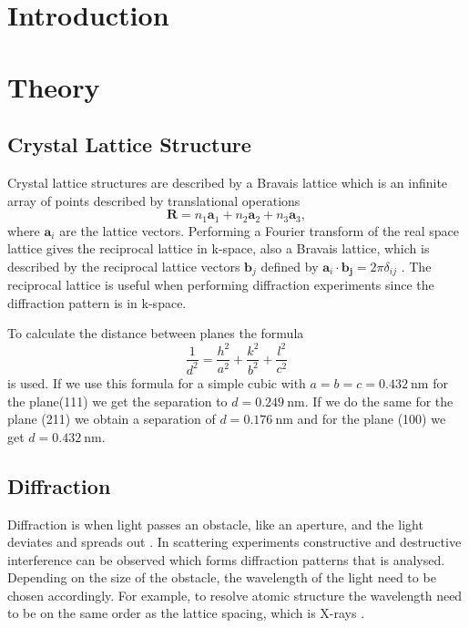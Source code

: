 \section{Introduction}


\section{Theory}
\subsection{Crystal Lattice Structure}
Crystal lattice structures are described by a Bravais lattice \cite{hofmann2015} which is an infinite array of points described by translational operations
\begin{equation}
    \mathbf{R} = n_1\mathbf{a}_1 + n_2\mathbf{a}_2 + n_3\mathbf{a}_3,
\end{equation}
where $\mathbf{a}_i$ are the lattice vectors. Performing a Fourier transform of the real space lattice gives the reciprocal lattice in k-space, also a Bravais lattice, which is described by the reciprocal lattice vectors $\mathbf{b}_j$ defined by $\mathbf{a}_i \cdot \mathbf{b_j} = 2\pi \delta_{ij}$ \cite{hofmann2015}. The reciprocal lattice is useful when performing diffraction experiments since the diffraction pattern is in k-space. 

To calculate the distance between planes the formula 
\begin{equation}
\frac{1}{d^2}=\frac{h^2}{a^2}+\frac{k^2}{b^2}+\frac{l^2}{c^2}
\label{eq:seperation}
\end{equation}
is used.
If we use this formula for a simple cubic with $a=b=c=\SI{0.432}{\nano\m}$ for the plane(111) we get the separation to $d=\SI{0.249}{\nano\m}$. If we do the same for the plane (211) we obtain a separation of $d=\SI{0.176}{\nano\m}$ and for the plane (100) we get $d=\SI{0.432}{\nano\m}$. 



\subsection{Diffraction}
Diffraction is when light passes an obstacle, like an aperture, and the light deviates and spreads out \cite{hofmann2015}. In scattering experiments constructive and destructive interference can be observed which forms diffraction patterns that is analysed. Depending on the size of the obstacle, the wavelength of the light need to be chosen accordingly. For example, to resolve atomic structure the wavelength need to be on the same order as the lattice spacing, which is X-rays \cite{hofmann2015}.

